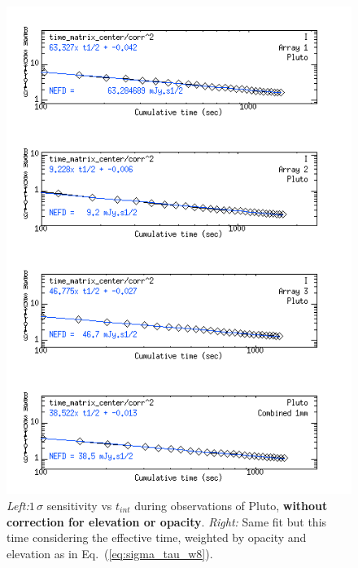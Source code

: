 \begin{figure}[htpb]
\begin{center}
\includegraphics[clip, angle=0, scale=0.4]{Figures/Pluto_8_sigma_vs_time_matrix_center_tau_w8.png}
\caption{\emph{Left:}$1\,\sigma$ sensitivity vs $t_{int}$ during observations of Pluto, {\bf
  without correction for elevation or opacity}. \emph{Right:} Same fit but this
  time considering the effective time, weighted by opacity and elevation as in Eq.~(\ref{eq:sigma_tau_w8}).}
\label{fig:Pluto_8_sigma_vs_time_matrix_center}
\end{center}
\end{figure}


